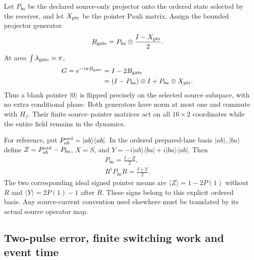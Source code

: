 Let $P_{ba}$ be the declared source-only projector onto the ordered
state selected by the receiver, and let $X_{\rm ptr}$ be the pointer
Pauli matrix. Assign the bounded projector generator
\begin{equation}
 B_{\rm gate}=P_{ba}\otimes\frac{I-X_{\rm ptr}}{2}.
 \label{eq:chvisd-projector-pointer-generator}
\end{equation}
At area $\int\lambda_{\rm gate}=\pi$,
\begin{equation}
 \begin{aligned}
 G=e^{-i\pi B_{\rm gate}}
   &=I-2B_{\rm gate}\\
   &=(I-P_{ba})\otimes I+P_{ba}\otimes X_{\rm ptr}.
 \end{aligned}
 \label{eq:chvisd-phase-free-controlled-pointer}
\end{equation}
Thus a blank pointer $|0\rangle$ is flipped precisely on the selected
source subspace, with no extra conditional phase. Both generators have
norm at most one and commute with $H_f$. Their finite source--pointer
matrices act on all $16\times2$ coordinates while the entire field
remains in the dynamics.

For reference, put $P^{\rm ord}_{ab}=|ab\rangle\langle ab|$.
In the ordered prepared-lane basis $|ab\rangle,|ba\rangle$
define $Z=P^{\rm ord}_{ab}-P_{ba}$, $X=S$, and
$Y=-i|ab\rangle\langle ba|+i|ba\rangle\langle ab|$.
Then
\begin{equation}
\begin{gathered}
P_{ba}=\frac{I-Z}{2},\\
 R^\dagger P_{ba}R=\frac{I+Y}{2}.
\end{gathered}
\label{eq:chvisd-pointer-observable-signs}
\end{equation}
The two corresponding ideal signed pointer means are
$\langle Z\rangle=1-2P(1)$ without $R$ and
$\langle Y\rangle=2P(1)-1$ after $R$. These signs belong to this
explicit ordered basis. Any source-current convention used elsewhere
must be translated by its actual source operator map.

\subsection{Two-pulse error, finite switching work and event time}
\label{sec:chvisd-readout-two-pulse-budget}

